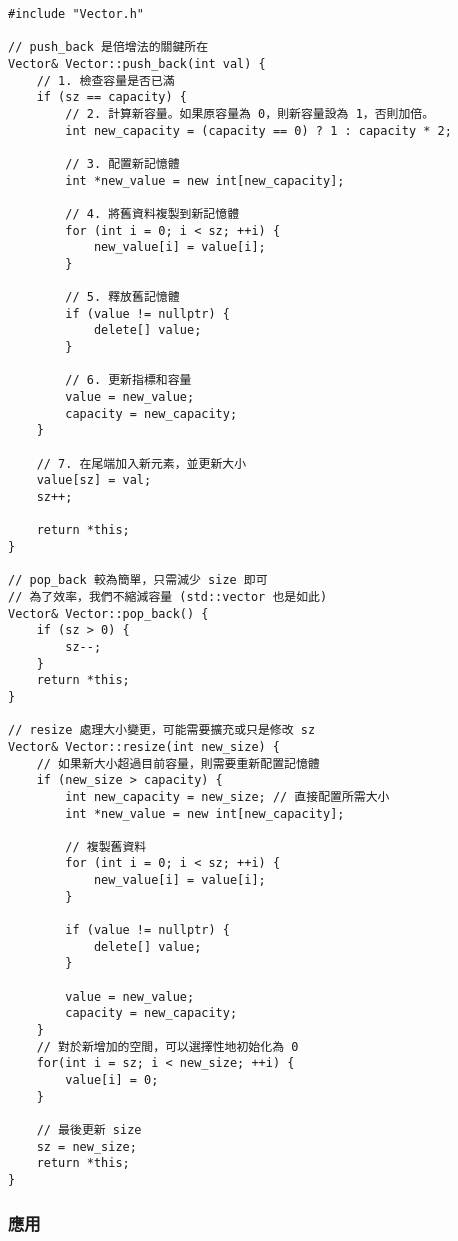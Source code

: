 \begin{lstlisting}[caption={Vector.cpp 的建議實作}]
#include "Vector.h"

// push_back 是倍增法的關鍵所在
Vector& Vector::push_back(int val) {
    // 1. 檢查容量是否已滿
    if (sz == capacity) {
        // 2. 計算新容量。如果原容量為 0，則新容量設為 1，否則加倍。
        int new_capacity = (capacity == 0) ? 1 : capacity * 2;
        
        // 3. 配置新記憶體
        int *new_value = new int[new_capacity];
        
        // 4. 將舊資料複製到新記憶體
        for (int i = 0; i < sz; ++i) {
            new_value[i] = value[i];
        }
        
        // 5. 釋放舊記憶體
        if (value != nullptr) {
            delete[] value;
        }
        
        // 6. 更新指標和容量
        value = new_value;
        capacity = new_capacity;
    }
    
    // 7. 在尾端加入新元素，並更新大小
    value[sz] = val;
    sz++;
    
    return *this;
}

// pop_back 較為簡單，只需減少 size 即可
// 為了效率，我們不縮減容量 (std::vector 也是如此)
Vector& Vector::pop_back() {
    if (sz > 0) {
        sz--;
    }
    return *this;
}

// resize 處理大小變更，可能需要擴充或只是修改 sz
Vector& Vector::resize(int new_size) {
    // 如果新大小超過目前容量，則需要重新配置記憶體
    if (new_size > capacity) {
        int new_capacity = new_size; // 直接配置所需大小
        int *new_value = new int[new_capacity];
        
        // 複製舊資料
        for (int i = 0; i < sz; ++i) {
            new_value[i] = value[i];
        }
        
        if (value != nullptr) {
            delete[] value;
        }
        
        value = new_value;
        capacity = new_capacity;
    }
    // 對於新增加的空間，可以選擇性地初始化為 0
    for(int i = sz; i < new_size; ++i) {
        value[i] = 0;
    }
    
    // 最後更新 size
    sz = new_size;
    return *this;
}
\end{lstlisting}

\subsubsection{應用}


